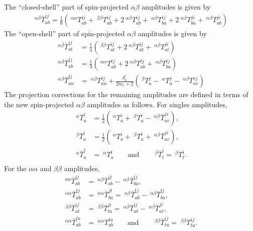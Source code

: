 \documentclass[a4paper,12pt,oneside]{book}
\begin{document}
The ``closed-shell'' part of spin-projected $\alpha\beta$ amplitudes is given by
\begin{equation}
\begin{aligned}
~^{αβ}\bar T^{ij}_{ab} = \frac{1}{6} ( ~^{αα}T^{ij}_{ab} + ~^{ββ}T^{ij}_{ab} + 2 ~^{αβ}T^{ij}_{ab} + ~^{αβ}T^{ij}_{ba} +2 ~^{αβ}T^{ji}_{ba} + ~^{αβ}T^{ji}_{ab})
\end{aligned}
\end{equation}
The ``open-shell'' part of spin-projected $\alpha\beta$ amplitudes is given by
\begin{equation}
\begin{aligned}
~^{αβ}\bar T^{ij}_{at} &= \frac{1}{3} ( ~^{ββ}T^{ij}_{at} + 2 ~^{αβ}T^{ij}_{at} + ~^{αβ}T^{ji}_{at})\\
~^{αβ}\bar T^{tj}_{ab} &= \frac{1}{3} ( ~^{αα}T^{tj}_{ab} + 2 ~^{αβ}T^{tj}_{ab} + ~^{αβ}T^{tj}_{ba})\\
~^{αβ}\bar T^{tj}_{au} &= ~^{αβ}T^{tj}_{au} + \frac{\delta^t_u}{2m_s + 2}\left( ~^{β}T^j_a - ~^{α}T^j_a - ~^{αβ}T^{vj}_{av} \right)
\end{aligned}
\end{equation}
The projection corrections for the remaining amplitudes are defined 
in terms of the new spin-projected $\alpha\beta$ amplitudes as follows.
For singles amplitudes,
\begin{equation}
\begin{aligned}
~^{α}\bar T^i_a &= \frac{1}{2}\left(~^{α}T^i_a + ~^{β}T^i_a - ~^{αβ}\bar T^{vi}_{av} \right),\\
~^{β}\bar T^i_a &= \frac{1}{2}\left(~^{α}T^i_a + ~^{β}T^i_a + ~^{αβ}\bar T^{vi}_{av} \right),\\
~^{α}\bar T^t_a &= ~^{α}T^t_a  \qquad \text{and} \qquad ~^{β}\bar T^i_t = ~^{β} T^i_t.\\
\end{aligned}
\end{equation}
For the $\alpha\alpha$ and $\beta\beta$ amplitudes,
\begin{equation}
\begin{aligned}
~^{\sigma\sigma}\bar T^{ij}_{ab} &= ~^{αβ}\bar T^{ij}_{ab} - ~^{αβ}\bar T^{ij}_{ba},\\
~^{αα}\bar T^{tj}_{ab} &= ~^{αα}\bar T^{jt}_{ba} = ~^{αβ}\bar T^{tj}_{ab} - ~^{αβ}\bar T^{tj}_{ba},\\
~^{ββ}\bar T^{ij}_{at} &= ~^{ββ}\bar T^{ji}_{ta} = ~^{αβ}\bar T^{ij}_{at} - ~^{αβ}\bar T^{ji}_{at},\\
~^{αα}\bar T^{tu}_{ab} &= ~^{αα} T^{tu}_{ab} \qquad \text{and} \qquad ~^{ββ}\bar T^{ij}_{tu} = ~^{ββ} T^{ij}_{tu}.\\
\end{aligned}
\end{equation}
\end{document}
